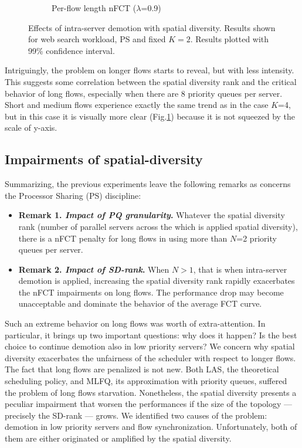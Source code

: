 \begin{figure}
\begin{subfigure}{.5\textwidth}
		\caption{Per-flow length nFCT ($\lambda$=0.9)}
		\label{fig:sdmlfq-variable-N-fct-detailed-K2}
	\end{subfigure}%
	\caption{Effects of intra-server demotion with spatial diversity. Results shown for web search workload, PS and fixed $K=2$. Results plotted with 99\% confidence interval.}
	\label{fig:sdmlfq-variable-N-K2}
\end{figure}%
Intriguingly, the problem on longer flows starts to reveal, but with less intensity. This suggests some correlation between the spatial diversity rank and the critical behavior of long flows, especially when there are 8 priority queues per server.  Short and medium flows experience exactly the same trend as in the case $K$=4, but in this case it is visually more clear (Fig.\ref{fig:sdmlfq-variable-N-fct-detailed-K2}) because it is not squeezed by the scale of y-axis. 
\subsection{Impairments of spatial-diversity}
Summarizing, the previous experiments leave the following remarks as concerns the Processor Sharing (PS) discipline:
\begin{itemize}
	\item \textbf{Remark 1. \textit{Impact of PQ granularity}.} Whatever the spatial diversity rank (number of parallel servers across the which is applied spatial diversity), there is a nFCT penalty for long flows in using more than $N$=2 priority queues per server.
	\item \textbf{Remark 2. \textit{Impact of SD-rank}.} When $N>1$, that is when intra-server demotion is applied, increasing the spatial diversity rank rapidly exacerbates the nFCT impairments on long flows. The performance drop may become unacceptable and dominate the behavior of the average FCT curve.
\end{itemize}
Such an extreme behavior on long flows was worth of extra-attention. In particular, it brings up two important questions: why does it happen? Is the best choice to continue demotion also in low priority servers?
We concern why spatial diversity exacerbates the unfairness of the scheduler with respect to longer flows. The fact that long flows are penalized is not new. Both LAS, the theoretical scheduling policy, and MLFQ, its approximation with priority queues, suffered the problem of long flows starvation. Nonetheless, the spatial diversity presents a peculiar impairment that worsen the performances if the size of the topology --- precisely the SD-rank --- grows. We identified two causes of the problem: demotion in low priority servers and flow synchronization. Unfortunately, both of them are either originated or amplified by the spatial diversity. 
